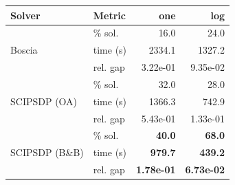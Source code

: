 \begin{tabular}{llrr}
\toprule
 Solver & Metric & one & log \\
\midrule
\multirow{3}{*}{Boscia} & \% sol. & 16.0 & 24.0 \\
  & time (s) & 2334.1 & 1327.2 \\
  & rel. gap & 3.22e-01 & 9.35e-02 \\
\midrule
\multirow{3}{*}{SCIPSDP (OA)} & \% sol. & 32.0 & 28.0 \\
  & time (s) & 1366.3 & 742.9 \\
  & rel. gap & 5.43e-01 & 1.33e-01 \\
\midrule
\multirow{3}{*}{SCIPSDP (B\&B)} & \% sol. & \textbf{40.0} & \textbf{68.0} \\
  & time (s) & \textbf{979.7} & \textbf{439.2} \\
  & rel. gap & \textbf{1.78e-01} & \textbf{6.73e-02} \\
\bottomrule
\end{tabular}
